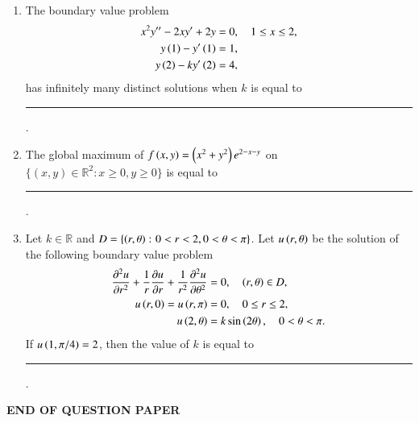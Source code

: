 \documentclass[journal,12pt,onecolumn]{IEEEtran}
\theoremstyle{remark}
\begin{document}
\begin{enumerate}
\item The boundary value problem
\begin{align*}
    x^2 y'' - 2xy' + 2y &= 0, \quad 1 \le x \le 2, \\
    y\left(1\right) - y'\left(1\right) &= 1, \\
    y\left(2\right) - ky'\left(2\right) &= 4,
\end{align*}
has infinitely many distinct solutions when $k$ is equal to \rule{3cm}{0.15mm} . \hfill{}

\item The global maximum of $f\left(x, y\right) = \left(x^2 + y^2\right)e^{2-x-y}$ on $\{(x, y) \in \mathbb{R}^2 \colon x \ge 0, y \ge 0\}$ is equal to \rule{3cm}{0.15mm} . \hfill{}

\item Let $k \in \mathbb{R}$ and $D = \{\left(r, \theta\right) \colon 0 < r < 2, 0 < \theta < \pi\}$. Let $u\left(r, \theta\right)$ be the solution of the following boundary value problem
\begin{align*}
    \frac{\partial^2 u}{\partial r^2} + \frac{1}{r}\frac{\partial u}{\partial r} + \frac{1}{r^2}\frac{\partial^2 u}{\partial \theta^2} &= 0, \quad \left(r, \theta\right) \in D, \\
    u\left(r, 0\right) = u\left(r, \pi\right) &= 0, \quad 0 \le r \le 2, \\
    u\left(2, \theta\right) &= k \sin\left(2\theta\right), \quad 0 < \theta < \pi.
\end{align*}
If $u\left(1, \pi/4\right) = 2$, then the value of $k$ is equal to \rule{3cm}{0.15mm} . \hfill{}

\end{enumerate}

\begin{center}
\textbf{END OF QUESTION PAPER}
\end{center}
\end{document}
